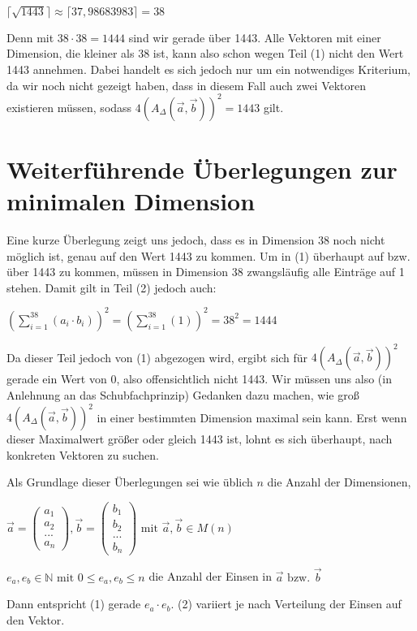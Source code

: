 \documentclass{article}
\newcommand{\sumN}[2]{\ensuremath{\sum\limits_{#1}^{#2}}}
\newcommand{\inN}[1]{\ensuremath{#1 \in \mathds{N}}}
\begin{document}
$\lceil \sqrt{1443} \rceil \approx \lceil 37,98683983 \rceil = 38$

Denn mit $38 \cdot 38 = 1444$ sind wir gerade über 1443. Alle Vektoren mit einer Dimension, die kleiner als 38 ist, kann also schon wegen Teil (1) nicht den Wert 1443 annehmen. Dabei handelt es sich jedoch nur um ein notwendiges Kriterium, da wir noch nicht gezeigt haben, dass in diesem Fall auch zwei Vektoren existieren müssen, sodass $4(A_\Delta(\vec a,\vec b))^2 = 1443$ gilt.

\section{Weiterführende Überlegungen zur minimalen Dimension}

Eine kurze Überlegung zeigt uns jedoch, dass es in Dimension 38 noch nicht möglich ist, genau auf den Wert 1443 zu kommen. Um in (1) überhaupt auf bzw. über 1443 zu kommen, müssen in Dimension 38 zwangsläufig alle Einträge auf 1 stehen. Damit gilt in Teil (2) jedoch auch:

$(\sumN{i=1}{38}(a_i \cdot b_i))^2 = (\sumN{i=1}{38}(1))^2 = 38^2 = 1444$

Da dieser Teil jedoch von (1) abgezogen wird, ergibt sich für $4(A_\Delta(\vec a,\vec b))^2$ gerade ein Wert von 0, also offensichtlich nicht 1443. Wir müssen uns also (in Anlehnung an das Schubfachprinzip) Gedanken dazu machen, wie groß $4(A_\Delta(\vec a,\vec b))^2$ in einer bestimmten Dimension maximal sein kann. Erst wenn dieser Maximalwert größer oder gleich 1443 ist, lohnt es sich überhaupt, nach konkreten Vektoren zu suchen.

Als Grundlage dieser Überlegungen sei wie üblich $n$ die Anzahl der Dimensionen,

$\vec a = \begin{pmatrix}a_1\\a_2\\...\\a_{n}\end{pmatrix}, \vec b = \begin{pmatrix}b_1\\b_2\\...\\b_{n}\end{pmatrix} \text{ mit } \vec a, \vec b \in M(n)$

$\inN{e_a, e_b} \text{ mit } 0 \leq e_a,e_b \leq n$ die Anzahl der Einsen in $\vec a \text{ bzw. } \vec b$

Dann entspricht (1) gerade $e_a \cdot e_b$. (2) variiert je nach Verteilung der Einsen auf den Vektor.
\end{document}

